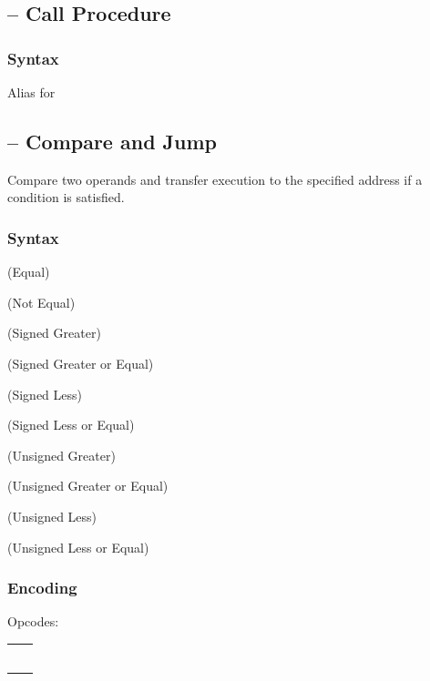 \documentclass[a4paper,12pt,twoside,extrafontsizes]{memoir}
\begin{document}
{\subsection{ -- Call Procedure}
\label{subsec:instr:call}

\subsubsection{Syntax}


Alias for 

\subsection{ -- Compare and Jump}
\label{subsec:instr:cjmpxxx}

Compare two operands and transfer execution to the specified address if a condition is satisfied.

\subsubsection{Syntax}

 (Equal)

 (Not Equal)

 (Signed Greater)

 (Signed Greater or Equal)

 (Signed Less)

 (Signed Less or Equal)

 (Unsigned Greater)

 (Unsigned Greater or Equal)

 (Unsigned Less)

 (Unsigned Less or Equal)

\subsubsection{Encoding}


Opcodes:

\begin{tabularx}{\textwidth}{lL}
   &  \\
  &  \\
  &  \\
 &  \\
  &  \\
 &  \\
\end{tabularx}

}
\end{document}

